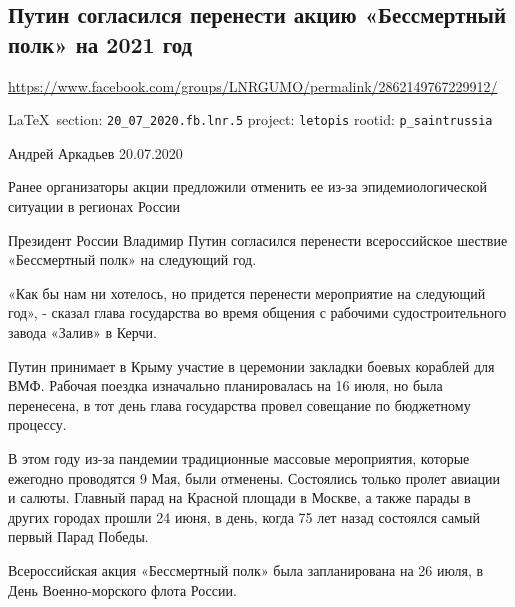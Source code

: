  
 

\subsection{Путин согласился перенести акцию «Бессмертный полк» на 2021 год}
\label{sec:20_07_2020.fb.lnr.5}
\url{https://www.facebook.com/groups/LNRGUMO/permalink/2862149767229912/}
  
\vspace{0.5cm}
{\small\LaTeX~section: \verb|20_07_2020.fb.lnr.5| project: \verb|letopis| rootid: \verb|p_saintrussia|}
\vspace{0.5cm}

Андрей Аркадьев 20.07.2020

Ранее организаторы акции предложили отменить ее из-за эпидемиологической
ситуации в регионах России

Президент России Владимир Путин согласился перенести всероссийское шествие
«Бессмертный полк» на следующий год.

«Как бы нам ни хотелось, но придется перенести мероприятие на следующий год», -
сказал глава государства во время общения с рабочими судостроительного завода
«Залив» в Керчи.

Путин принимает в Крыму участие в церемонии закладки боевых кораблей для ВМФ.
Рабочая поездка изначально планировалась на 16 июля, но была перенесена, в тот
день глава государства провел совещание по бюджетному процессу.

В этом году из-за пандемии традиционные массовые мероприятия, которые ежегодно
проводятся 9 Мая, были отменены. Состоялись только пролет авиации и салюты.
Главный парад на Красной площади в Москве, а также парады в других городах
прошли 24 июня, в день, когда 75 лет назад состоялся самый первый Парад Победы.

Всероссийская акция «Бессмертный полк» была запланирована на 26 июля, в День
Военно-морского флота России. 
